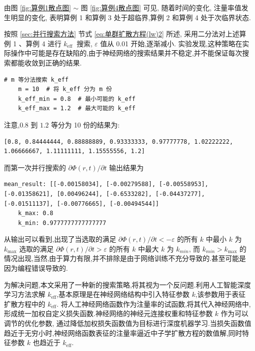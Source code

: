 \documentclass{Sichuan Normal University}
\begin{document}
由图 \ref{fig:算例1散点图} $\sim$ 图 \ref{fig:算例4散点图} 可见, 随着时间的变化, 注量率值发生明显的变化, 表明算例 1 和算例 3 处于超临界,算例 2 和算例 4 处于次临界状态.

按照 \ref{sec:并行搜索方法} 节式 \eqref{eq:单群扩散方程(lw)2} 所述, 采用二分法对上述算例 1 、算例 4 进行 $k_{\text {eff }}$ 搜索, $\varepsilon$ 值从 0.01 开始,逐渐减小.
实验发现,这种策略在实际操作中可能是存在缺陷的,由于神经网络的搜索结果并不稳定,并不能保证每次搜索都能收敛到正确的结果.
\begin{lstlisting}[style=python,basicstyle=\footnotesize\fontspec{Courier New},]  
    # m 等分法搜索 k_eff
    m = 10  # 将 k_eff 分为 m 份
    k_eff_min = 0.8  # 最小可能的 k_eff
    k_eff_max = 1.2  # 最大可能的 k_eff
\end{lstlisting}
注意,$0.8$ 到 $1.2$ 等分为 10 份的结果为:
\begin{lstlisting}[style=python,basicstyle=\footnotesize\fontspec{Courier New},]  
    [0.8, 0.84444444, 0.88888889, 0.93333333, 0.97777778, 1.02222222, 1.06666667, 1.11111111, 1.15555556, 1.2]
\end{lstlisting}
而第一次并行搜索的 $\partial \Phi(r, t) / \partial t$ 输出结果为
\begin{lstlisting}[style=python,basicstyle=\footnotesize\fontspec{Courier New},]  
    mean_result: [[-0.00158034], [-0.00279588], [-0.00558953], [-0.01358621], [0.00496244], [-0.6533282], [-0.04437277], [-0.01511137], [-0.00776665], [-0.00494544]]  
    k_max: 0.8
    k_min: 0.9777777777777777
\end{lstlisting}
从输出可以看到,出现了当选取的满足 $\partial \Phi(r, t) / \partial t<-\varepsilon$ 的所有 $k$ 中最小 $k$ 为 $k_{\max }$
选取的满足 $\partial \Phi(r, t) / \partial t>\varepsilon$ 的所有 $k$ 中最大 $k$ 为 $k_{min}$,
而 $k_{min} > k_{\max }$ 的情况出现,当然,由于算力有限,并不排除是由于网络训练不充分导致的.甚至可能是因为编程错误导致的.

为解决问题,本文采用了一种新的搜索策略,将其视为一个反问题.利用人工智能深度学习方法求解 $k_{\text{eff}}$,基本原理是在神经网络结构中引入特征参数 $k$,该参数用于表征扩散方程中的 $k_{\text{eff}}$.
将人工神经网络函数作为注量率的试函数,将其代入神经网络中,形成统一加权自定义损失函数.神经网络的神经元连接权重和特征参数 $k$ 作为可以调节的优化参数,
通过降低加权损失函数值为目标进行深度机器学习\cite{LiuDongHeFanYingDuiYouXiaoZengZhiXiShuShenDuXueXiZhiJieSouSuoQiuJieFangFa2023}.当损失函数值趋近于无穷小时,神经网络函数表征的注量率逼近中子学扩散方程的数值解,同时特征参数 $k$ 也趋近于 $k_{\text{eff}}$.
\end{document}
